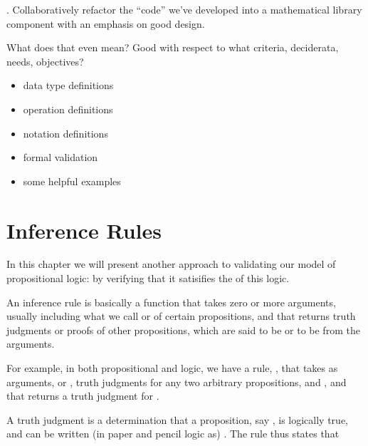 \documentclass[letterpaper,10pt,english]{sphinxmanual}
\begin{document}
. Collaboratively refactor the “code” we’ve
developed into a mathematical library component
with an emphasis on good design.

\sphinxAtStartPar
What does that even mean? Good with respect to
what criteria, deciderata, needs, objectives?
\begin{itemize}
\item {} 
\sphinxAtStartPar
data type definitions

\item {} 
\sphinxAtStartPar
operation definitions

\item {} 
\sphinxAtStartPar
notation definitions

\item {} 
\sphinxAtStartPar
formal validation

\item {} 
\sphinxAtStartPar
some helpful examples

\end{itemize}


\section{Inference Rules}
\label{\detokenize{A_01_Propositional_Logic:inference-rules}}
\sphinxAtStartPar
In this chapter we will present another approach
to validating our model of propositional logic: by
verifying that it satisifies the 
of this logic.

\sphinxAtStartPar
An inference rule is basically a function that takes
zero or more arguments, usually including what we call
 or  of certain propositions,
and that returns truth judgments or proofs of other
propositions, which are said to be  or to be
 from the arguments.

\sphinxAtStartPar
For example, in both propositional and  logic, we have a rule, ,
that takes as arguments, or , truth judgments
for any two arbitrary propositions,  and , and
that returns a truth judgment for .

\sphinxAtStartPar
A truth judgment is a determination that a proposition,
say , is logically true, and can be written (in paper
and pencil logic as) . The 
rule thus states that 
\end{document}
